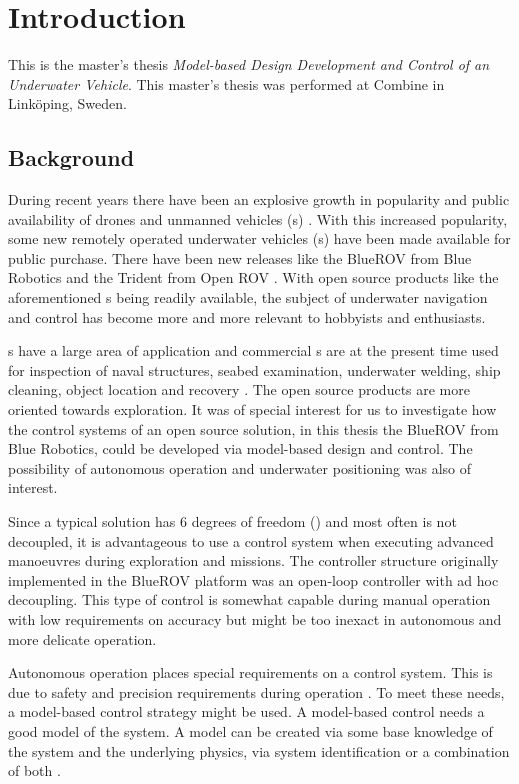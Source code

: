 \chapter{Introduction}\label{cha:intro}
This is the master's thesis \textit{Model-based Design Development and Control of an Underwater Vehicle}.
This master's thesis was performed at Combine in Linköping, Sweden.

\section{Background}
During recent years there have been an explosive growth in popularity and public availability of drones and unmanned vehicles (\abbrUV{}s) \citep{popmechanics}. With this increased popularity, some new remotely operated underwater vehicles (\abbrROV{}s) have been made available for public purchase. There have been new releases like the BlueROV from Blue Robotics \citep{bluerobotics} and the Trident from Open ROV \citep{openrov}. With open source products like the aforementioned \abbrROV{}s being readily available, the subject of underwater navigation and control has become more and more relevant to hobbyists and enthusiasts.

\abbrROV{}s have a large area of application and commercial \abbrROV{}s are at the present time used for inspection of naval structures, seabed examination, underwater welding, ship cleaning, object location and recovery \citep{saab}. The open source products are more oriented towards exploration. It was of special interest for us to investigate how the control systems of an open source \abbrROV solution, in this thesis the BlueROV from Blue Robotics, could be developed via model-based design and control. The possibility of autonomous operation and underwater positioning was also of interest.

Since a typical \abbrROV solution has 6 degrees of freedom (\abbrDOF) and most often is not decoupled, it is advantageous to use a control system when executing advanced manoeuvres during exploration and missions. The controller structure originally implemented in the BlueROV platform was an open-loop controller with ad hoc decoupling. This type of control is somewhat capable during manual operation with low requirements on accuracy but might be too inexact in autonomous and more delicate operation. 

Autonomous operation places special requirements on a control system. This is due to safety and precision requirements during operation \citep[p. 416]{safety}. To meet these needs, a model-based control strategy might be used. A model-based control needs a good model of the system. A model can be created via some base knowledge of the system and the underlying physics, via system identification or a combination of both \citet{modellbygge}. 

